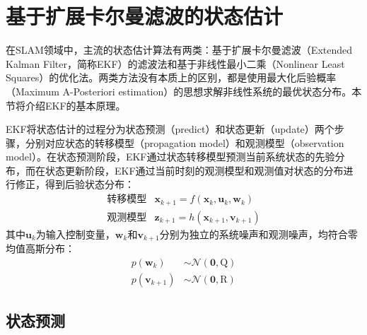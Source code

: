 \section{基于扩展卡尔曼滤波的状态估计}

在SLAM领域中，主流的状态估计算法有两类：基于扩展卡尔曼滤波（Extended Kalman Filter，简称EKF）的滤波法和基于非线性最小二乘（Nonlinear Least Squares）的优化法。两类方法没有本质上的区别，都是使用最大化后验概率（Maximum A-Posteriori estimation）的思想求解非线性系统的最优状态分布。本节将介绍EKF的基本原理。

EKF将状态估计的过程分为状态预测（predict）和状态更新（update）两个步骤，分别对应状态的转移模型（propagation model）和观测模型（observation model）。在状态预测阶段，EKF通过状态转移模型预测当前系统状态的先验分布，而在状态更新阶段，EKF通过当前时刻的观测模型和观测值对状态的分布进行修正，得到后验状态分布：
\begin{equation}
\begin{array}{rl}
    \text{转移模型} & \bm{x}_{k+1} = f(\bm{x}_k,\bm{u}_k,\bm{w}_k) \\
    \text{观测模型} & \bm{z}_{k+1} = h(\bm{x}_{k+1},\bm{v}_{k+1})
\end{array}
\end{equation}
其中$\bm{u}_k$为输入控制变量，$\bm{w}_k$和$\bm{v}_{k+1}$分别为独立的系统噪声和观测噪声，均符合零均值高斯分布：
\begin{equation}
\begin{aligned}
    p(\bm{w}_k)     &\sim \mathcal{N}(\bm{0},\mathrm{Q}) \\
    p(\bm{v}_{k+1}) &\sim \mathcal{N}(\bm{0},\mathrm{R})
\end{aligned}
\end{equation}

\subsection{状态预测}


